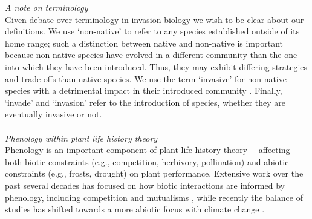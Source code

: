 \documentclass[11pt,a4paper,oneside]{article}
\begin{document}
\noindent \emph{A note on terminology}\\
Given debate over terminology in invasion biology \citep{Colautti2009} we wish to be clear about our definitions. We use `non-native' to refer to any species established outside of its home range; such a distinction between native and non-native is important because non-native species have evolved in a different community than the one into which they have been introduced. Thus, they may exhibit differing strategies and trade-offs than native species.  We use the term `invasive' for non-native species with a detrimental impact in their introduced community \citep[following][]{Mack:2000bn}. Finally, `invade' and `invasion' refer to the introduction of species, whether they are eventually invasive or not.\\

\\

\noindent \emph{Phenology within plant life history theory}\\
\noindent Phenology is an important component of plant life history theory \citep{Almufti1977,Grime:1977sw,stanton2000}---affecting both biotic constraints (e.g., competition, herbivory, pollination) and abiotic constraints (e.g., frosts, drought) on plant performance. Extensive work over the past several decades has focused on how biotic interactions are informed by phenology, including competition \citep[e.g.,][]{Rathcke:1988yc,VANSCHAIK:1993uq} and mutualisms \citep[e.g.,][]{Brody:1997ro}, while recently the balance of studies has shifted towards a more abiotic focus with climate change \citep[e.g.,][]{Inouye:2008gj,Miller-Rushing:2008zv}.
\end{document}
